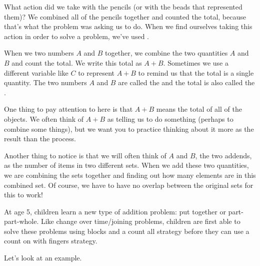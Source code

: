 \documentclass{ximera}
\begin{document}
What action did we take with the pencils (or with the beads that represented them)? We combined all of the pencils together and counted the total, because that's what the problem was asking us to do. When we find ourselves taking this action in order to solve a problem, we've used .

\begin{definition}
When we  two numbers $A$ and $B$ together, we combine the two quantities $A$ and $B$ and count the total. We write this total as $A+B$. Sometimes we use a different variable like $C$ to represent $A+B$ to remind us that the total is a single quantity. The two numbers $A$ and $B$ are called the  and the total is also called the .
\begin{image}
\end{image}
\end{definition}

One thing to pay attention to here is that $A+B$ means the total of all of the objects. We often think of $A+B$ as telling us to do something (perhaps to combine some things), but we want you to practice thinking about it more as the result than the process.

Another thing to notice is that we will often think of $A$ and $B$, the two addends, as the number of items in two different sets. When we add these two quantities, we are combining the sets together and finding out how many elements are in this combined set. Of course, we have to have no overlap between the original sets for this to work!

At age 5, children learn a new type of addition problem: put together or part-part-whole. Like change over time/joining problems, children are first able to solve these problems using blocks and a count all strategy before they can use a count on with fingers strategy. 

Let's look at an example.
\end{document}
